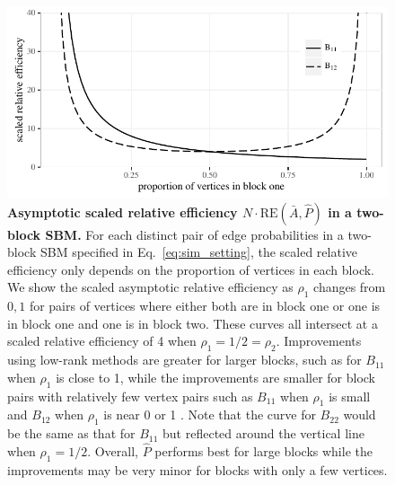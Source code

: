 \documentclass[10pt,letterpaper]{article}
\renewcommand{\hat}{\widehat}
\begin{document}
\begin{figure}[!t]
\centering
\includegraphics[width=1\textwidth]{Rho.pdf}
\caption{{\bf Asymptotic scaled relative efficiency $N\cdot \mathrm{RE}(\bar{A},\hat{P})$ in a two-block SBM.}
For each distinct pair of edge probabilities in a two-block SBM specified in Eq.~\ref{eq:sim_setting}, the scaled relative efficiency only depends on the proportion of vertices in each block.
We show the scaled asymptotic relative efficiency as $\rho_1$ changes from $0,1$ for pairs of vertices where either both are in block one or one is in block one and one is in block two. 
These curves all intersect at a scaled relative efficiency of 4 when $\rho_1=1/2=\rho_2$.
Improvements using low-rank methods are greater for larger blocks, such as for $B_{11}$ when $\rho_1$ is close to 1, while the improvements are smaller for block pairs with relatively few vertex pairs such as $B_{11}$ when $\rho_1$ is small and $B_{12}$ when $\rho_1$ is near 0 or 1
.
Note that the curve for $B_{22}$ would be the same as that for $B_{11}$ but reflected around the vertical line when $\rho_1=1/2$.
Overall, $\hat{P}$ performs best for large blocks while the improvements may be very minor for blocks with only a few vertices.
}
\label{fig:RErho}
\end{figure}
\end{document}
